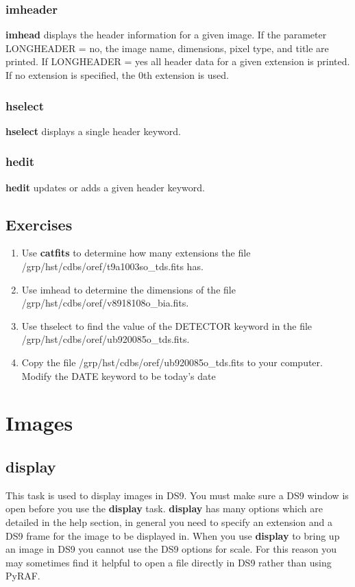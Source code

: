 \subsubsection{{\bf imheader}}
{\bf imhead} displays the header information for a given image. If the parameter LONGHEADER = no, the image name, dimensions, pixel type, and title are printed. If LONGHEADER = yes all header data for a given extension is printed. If no extension is specified, the 0th extension is used.
\subsubsection{{\bf hselect}}
{\bf hselect} displays a single header keyword. 
\subsubsection{{\bf hedit}}
{\bf hedit} updates or adds a given header keyword.

\subsection{Exercises}
\begin{enumerate}
\item Use {\bf catfits} to determine how many extensions the file /grp/hst/cdbs/oref/t9a1003so\_tds.fits has. 
\item Use imhead to determine the dimensions of the file /grp/hst/cdbs/oref/v8918108o\_bia.fits. 
\item Use thselect to find the value of the DETECTOR keyword in the file \\ /grp/hst/cdbs/oref/ub920085o\_tds.fits.
\item Copy the file /grp/hst/cdbs/oref/ub920085o\_tds.fits to your computer. Modify the DATE keyword to be today's date
\end{enumerate}

\section{Images}
\subsection{{\bf display}}
This task is used to display images in DS9. You must make sure a DS9 window is open before you use the {\bf display} task. {\bf display} has many options which are detailed in the help section, in general you need to specify an extension and a DS9 frame for the image to be displayed in. When you use {\bf display} to bring up an image in DS9 you cannot use the DS9 options for scale. For this reason you may sometimes find it helpful to open a file directly in DS9 rather than using PyRAF.

